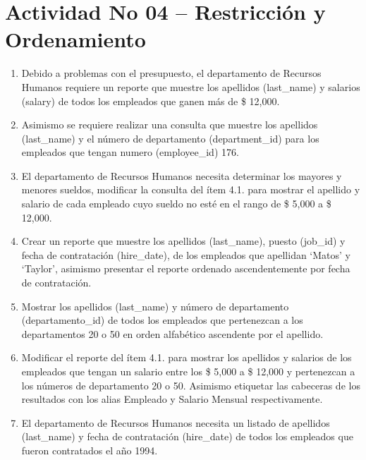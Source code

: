 \section{Actividad No 04 – Restricci\'on y Ordenamiento} 
		
\begin{enumerate}[1.]
	\item Debido a problemas con el presupuesto, el departamento de Recursos Humanos requiere un reporte que muestre los apellidos (last\_name) y salarios (salary) de todos los empleados que ganen más de \$ 12,000.
	\\ 

	\item Asimismo se requiere realizar una consulta que muestre los apellidos (last\_name) y el n\'umero de departamento (department\_id) para los empleados que tengan numero (employee\_id) 176.
	\\ 

	\item El departamento de Recursos Humanos necesita determinar los mayores y menores sueldos, modificar la consulta del  ítem 4.1. para mostrar el apellido y salario de cada empleado cuyo sueldo no est\'e en el rango de \$ 5,000 a \$ 12,000.
	\\ 

	\item Crear un reporte que muestre los apellidos (last\_name), puesto (job\_id) y fecha de contrataci\'on (hire\_date), de los empleados que apellidan ‘Matos’ y ‘Taylor’, asimismo presentar el reporte ordenado ascendentemente por fecha de contrataci\'on.
	\\ 

	\item Mostrar los apellidos (last\_name) y n\'umero de departamento (departamento\_id) de todos los empleados que pertenezcan a los departamentos 20 o 50 en orden alfab\'etico ascendente por el apellido.
	\\ 
	
	\item Modificar el reporte del ítem 4.1. para mostrar los apellidos y salarios de los empleados que tengan un salario entre los \$ 5,000 a \$ 12,000 y pertenezcan a los números de departamento 20 o 50. Asimismo etiquetar las cabeceras de los resultados con los alias Empleado y Salario Mensual respectivamente.
	\\ 

	\item El departamento de Recursos Humanos necesita un listado de apellidos (last\_name) y fecha de contrataci\'on (hire\_date) de todos los empleados que fueron contratados el año 1994.
	\\ 


\end{enumerate}
